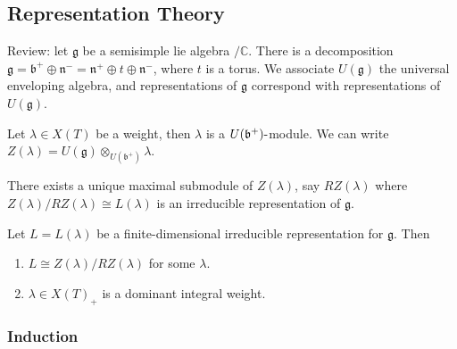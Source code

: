 \hypertarget{representation-theory}{%
\subsection{Representation Theory}\label{representation-theory}}

Review: let \({\mathfrak{g}}\) be a semisimple lie algebra
\(/{\mathbb{C}}\). There is a decomposition
\({\mathfrak{g}}= {\mathfrak{b}}^+ \oplus {\mathfrak{n}}^- = {\mathfrak{n}}^+ \oplus t\oplus {\mathfrak{n}}^-\),
where \(t\) is a torus. We associate \(U({\mathfrak{g}})\) the universal
enveloping algebra, and representations of \({\mathfrak{g}}\) correspond
with representations of \(U({\mathfrak{g}})\).

Let \(\lambda \in X(T)\) be a weight, then \(\lambda\) is a
\(U({\mathfrak{b}}^+){\hbox{-}}\)module. We can write
\(Z(\lambda) = U({\mathfrak{g}}) \otimes_{U({\mathfrak{b}}^+)} \lambda\).

\begin{remark}

\begin{remark}

There exists a unique maximal submodule of \(Z(\lambda)\), say
\(RZ(\lambda)\) where \(Z(\lambda)/RZ(\lambda) \cong L(\lambda)\) is an
irreducible representation of \({\mathfrak{g}}\).

\end{remark}

\end{remark}

\begin{theorem}[?]

\begin{theorem}[?]

Let \(L = L(\lambda)\) be a finite-dimensional irreducible
representation for \({\mathfrak{g}}\). Then

\begin{enumerate}
\def\labelenumi{\arabic{enumi}.}
\tightlist
\item
  \(L \cong Z(\lambda)/RZ(\lambda)\) for some \(\lambda\).
\item
  \(\lambda \in X(T)_+\) is a dominant integral weight.
\end{enumerate}

\end{theorem}

\end{theorem}

\hypertarget{induction}{%
\subsubsection{Induction}\label{induction}}

